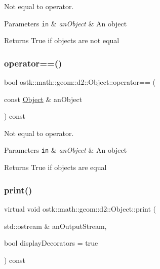 Not equal to operator. 


\begin{DoxyParams}[1]{Parameters}
\mbox{\tt in}  & {\em an\+Object} & An object \\
\hline
\end{DoxyParams}
\begin{DoxyReturn}{Returns}
True if objects are not equal 
\end{DoxyReturn}
\mbox{\label{classostk_1_1math_1_1geom_1_1d2_1_1_object_aa26e3719b4b10fc5c65d047a91cf0f51}} 
\subsubsection{\texorpdfstring{operator==()}{operator==()}}
{\footnotesize\ttfamily bool ostk\+::math\+::geom\+::d2\+::\+Object\+::operator== (\begin{DoxyParamCaption}\item[{const \hyperlink{classostk_1_1math_1_1geom_1_1d2_1_1_object}{Object} \&}]{an\+Object }\end{DoxyParamCaption}) const}



Not equal to operator. 


\begin{DoxyParams}[1]{Parameters}
\mbox{\tt in}  & {\em an\+Object} & An object \\
\hline
\end{DoxyParams}
\begin{DoxyReturn}{Returns}
True if objects are equal 
\end{DoxyReturn}
\mbox{\label{classostk_1_1math_1_1geom_1_1d2_1_1_object_ae05ad883ed5a560e38f0aae7a4adc1ea}} 
\subsubsection{\texorpdfstring{print()}{print()}}
{\footnotesize\ttfamily virtual void ostk\+::math\+::geom\+::d2\+::\+Object\+::print (\begin{DoxyParamCaption}\item[{std\+::ostream \&}]{an\+Output\+Stream,  }\item[{bool}]{display\+Decorators = {\ttfamily true} }\end{DoxyParamCaption}) const\hspace{0.3cm}{\ttfamily [pure virtual]}}



